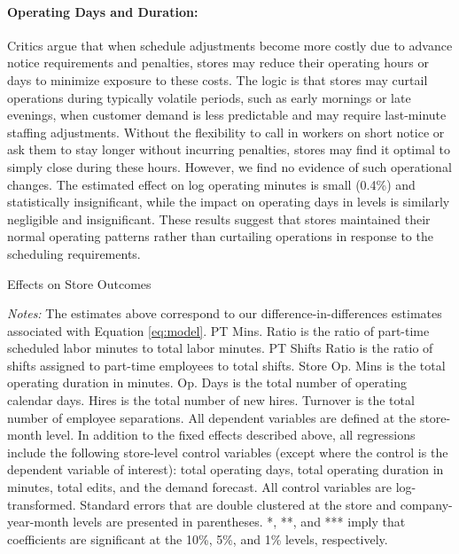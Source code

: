 \documentclass[letterpaper,11pt,leqno]{article}
\theoremstyle{paper}
\newcommand{\note}[2][]{\parbox{\textwidth}{\footnotesize\vspace*{10pt}\textit{#1}#2}}
\begin{document}
\paragraph{Operating Days and Duration:} Critics argue that when schedule adjustments become more costly due to advance notice requirements and penalties, stores may reduce their operating hours or days to minimize exposure to these costs. The logic is that stores may curtail operations during typically volatile periods, such as early mornings or late evenings, when customer demand is less predictable and may require last-minute staffing adjustments. Without the flexibility to call in workers on short notice or ask them to stay longer without incurring penalties, stores may find it optimal to simply close during these hours. However, we find no evidence of such operational changes. The estimated effect on log operating minutes is small (0.4\%) and statistically insignificant, while the impact on operating days in levels is similarly negligible and insignificant. These results suggest that stores maintained their normal operating patterns rather than curtailing operations in response to the scheduling requirements.


\begin{singlespace}
\begin{table}[h]
\caption{Effects on Store Outcomes}

\note{\textit{Notes: } \scriptsize The estimates above correspond to our difference-in-differences estimates associated with Equation \ref{eq:model}.
PT Mins. Ratio is the ratio of part-time scheduled labor minutes to total labor minutes. PT Shifts Ratio is the ratio of shifts assigned to part-time employees to total shifts. Store Op. Mins is the total operating duration in minutes. Op. Days is the total number of operating calendar days. Hires is the total number of new hires. Turnover is the total number of employee separations. All dependent variables are defined at the store-month level. In addition to the fixed effects described above, all regressions include the following store-level control variables (except where the control is the dependent variable of interest): total operating days, total operating duration in minutes, total edits, and the demand forecast. All control variables are log-transformed. Standard errors that are double clustered at the store and company-year-month levels are presented in parentheses. *, **, and *** imply that coefficients are significant at the 10\%, 5\%, and 1\% levels, respectively.}
\label{table:store_level}
\end{table}
\end{singlespace}
\end{document}
